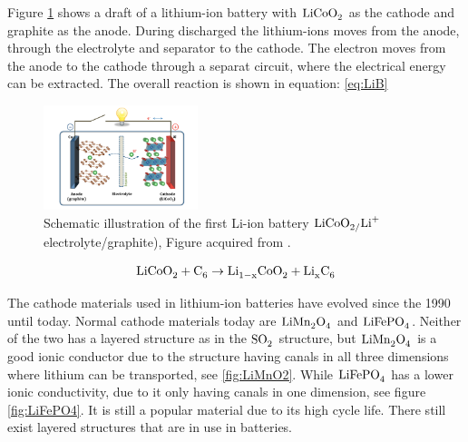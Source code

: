 Figure \ref{fig:LiCoO2} shows a draft of a lithium-ion battery with $\ce{LiCoO_2}$ as the cathode and graphite as the anode. During discharged the lithium-ions moves from the anode, through the electrolyte and separator to the cathode. The electron moves from the anode to the cathode through a separat circuit, where the electrical energy can be extracted. The overall reaction is shown in equation: \ref{eq:LiB}

\begin{figure}[H]
    \centering
    \includegraphics[width=0.4\textwidth]{Li-ion_inter.png}
    \caption{Schematic illustration of the first Li-ion battery $\ce{LiCoO_2/Li^+}$ electrolyte/graphite), Figure acquired from  \cite{goodenough2013li}.}
    \label{fig:LiCoO2}
\end{figure}

\begin{align}\label{eq:LiB}
\ce{LiCoO_2} + \ce{C_6} \rightarrow \ce{Li_{1-x}CoO_2} + \ce{Li_xC_6}
\end{align}

The cathode materials used in lithium-ion batteries have evolved since the 1990 until today. Normal cathode materials today are $\ce{LiMn_2O_4}$ and $\ce{LiFePO_4}$. Neither of the two has a layered structure as in the $\ce{SO_2}$ structure, but $\ce{LiMn_2O_4}$ is a good ionic conductor due to the structure having canals in all three dimensions where lithium can be transported, see \ref{fig:LiMnO2}. While $\ce{LiFePO_4}$ has a lower ionic conductivity, due to it only having  canals in one dimension, see figure \ref{fig:LiFePO4}. It is still a popular material due to its high cycle life. There still exist layered structures that are in use in batteries.



